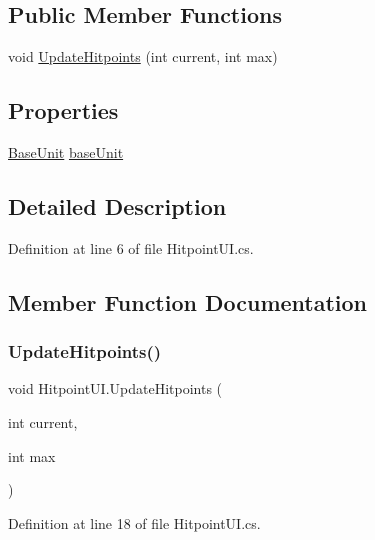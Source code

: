 \subsection*{Public Member Functions}
\begin{DoxyCompactItemize}
\item 
void \mbox{\hyperlink{class_hitpoint_u_i_a276f8fb6a38204f4155f32c48c6322af}{Update\+Hitpoints}} (int current, int max)
\end{DoxyCompactItemize}
\subsection*{Properties}
\begin{DoxyCompactItemize}
\item 
\mbox{\hyperlink{class_base_unit}{Base\+Unit}} \mbox{\hyperlink{class_hitpoint_u_i_a6dfd0f75896f8f70dc7f2dc0ff34fb42}{base\+Unit}}
\end{DoxyCompactItemize}


\subsection{Detailed Description}


Definition at line 6 of file Hitpoint\+U\+I.\+cs.



\subsection{Member Function Documentation}
\mbox{\label{class_hitpoint_u_i_a276f8fb6a38204f4155f32c48c6322af}} 
\subsubsection{\texorpdfstring{UpdateHitpoints()}{UpdateHitpoints()}}
{\footnotesize\ttfamily void Hitpoint\+U\+I.\+Update\+Hitpoints (\begin{DoxyParamCaption}\item[{int}]{current,  }\item[{int}]{max }\end{DoxyParamCaption})}



Definition at line 18 of file Hitpoint\+U\+I.\+cs.

